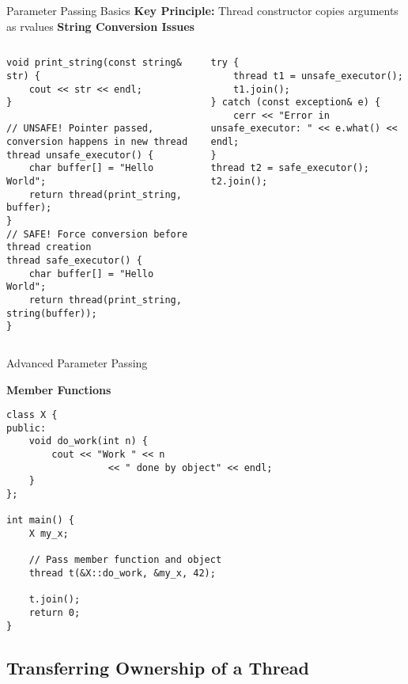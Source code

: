 \begin{frame}[fragile]{Parameter Passing Basics}
	\textbf{Key Principle:} Thread constructor copies arguments as rvalues
	\textbf{String Conversion Issues}
	\begin{columns}
		\begin{column}{0.6\textwidth}
			\begin{verbatim}
void print_string(const string& str) {
    cout << str << endl;
}

// UNSAFE! Pointer passed, conversion happens in new thread
thread unsafe_executor() {
    char buffer[] = "Hello World";
    return thread(print_string, buffer);
}
// SAFE! Force conversion before thread creation
thread safe_executor() {
    char buffer[] = "Hello World";
    return thread(print_string, string(buffer));
}
			\end{verbatim}
		\end{column}
		\begin{column}{0.4\textwidth}
			\begin{verbatim}
try {
    thread t1 = unsafe_executor();
    t1.join();
} catch (const exception& e) {
    cerr << "Error in unsafe_executor: " << e.what() << endl;
}
thread t2 = safe_executor();
t2.join();
			\end{verbatim}
		\end{column}
	\end{columns}
\end{frame}

\begin{frame}[fragile]{Advanced Parameter Passing}

	\textbf{Member Functions}
	\begin{verbatim}
class X {
public:
    void do_work(int n) {
        cout << "Work " << n
                  << " done by object" << endl;
    }
};

int main() {
    X my_x;

    // Pass member function and object
    thread t(&X::do_work, &my_x, 42);

    t.join();
    return 0;
}
			\end{verbatim}
\end{frame}

\subsection{Transferring Ownership of a Thread}

